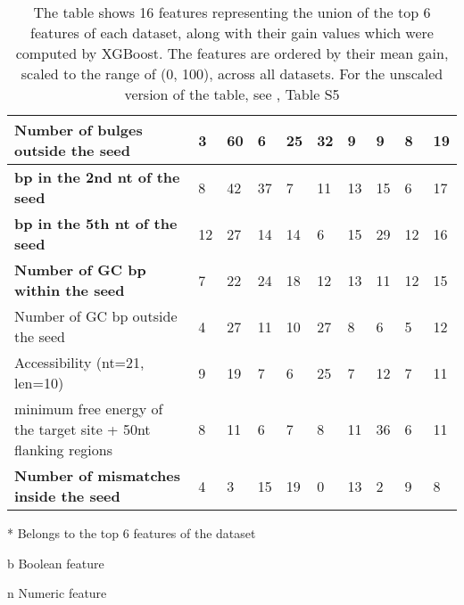 \documentclass{bmcart}
\begin{document}
\begin{backmatter}
\begin{table}[h!]
\begin{threeparttable}
{\begin{tabular}{|l|l|l|l|l|l|l|l|l|l|}
Number of bulges outside the seed\tnote{n}                 & 3            & 60\tnote{*}           & 6            & 25\tnote{*}          & 32\tnote{*}          & 9           & 9           & 8           & 19            \\ \hline
\textbf{bp in the 2nd nt of the seed\tnote{b}}                    & 8            & 42           & 37\tnote{*}           & 7           & 11          & 13          & 15          & 6           & 17            \\ \hline
\textbf{bp in the 5th nt of the seed\tnote{b}}                    & 12           & 27           & 14           & 14          & 6           & 15          & 29\tnote{*}          & 12          & 16            \\ \hline
\textbf{Number of GC bp within the seed\tnote{n}}              & 7            & 22           & 24\tnote{*}           & 18\tnote{*}          & 12          & 13          & 11          & 12          & 15            \\ \hline
Number of GC bp outside the seed\tnote{n}                         & 4            & 27           & 11           & 10          & 27\tnote{*}          & 8           & 6           & 5           & 12            \\ \hline
Accessibility (nt=21, len=10)\tnote{n}                                    & 9            & 19           & 7            & 6           & 25          & 7           & 12          & 7           & 11            \\ \hline
minimum free energy of the target site + 50nt flanking regions\tnote{n}            & 8            & 11           & 6            & 7           & 8           & 11          & 36\tnote{*}          & 6           & 11            \\ \hline
\textbf{Number of mismatches inside the seed\tnote{n}}    & 4            & 3            & 15           & 19\tnote{*}          & 0           & 13          & 2           & 9           & 8             \\ \hline
\end{tabular}}
\begin{tablenotes}\footnotesize
\item[*] Belongs to the top 6 features of the dataset
\item[b] Boolean feature
\item[n] Numeric feature

\end{tablenotes}
 \end{threeparttable}
 \caption*{The table shows 16 features representing the union of the top 6 features of each dataset, along with their gain values which were computed by XGBoost. The features are ordered by their mean gain, scaled to the range of (0, 100), across all datasets. For the unscaled version of the table, see , Table S5}
\end{table}



\end{backmatter}
\end{document}
